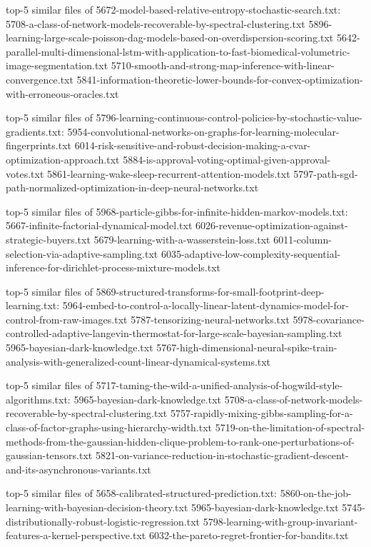 \documentclass[11pt]{article}
\begin{document}
top-5 similar files of
5672-model-based-relative-entropy-stochastic-search.txt:
5708-a-class-of-network-models-recoverable-by-spectral-clustering.txt
5896-learning-large-scale-poisson-dag-models-based-on-overdispersion-scoring.txt
5642-parallel-multi-dimensional-lstm-with-application-to-fast-biomedical-volumetric-image-segmentation.txt
5710-smooth-and-strong-map-inference-with-linear-convergence.txt
5841-information-theoretic-lower-bounds-for-convex-optimization-with-erroneous-oracles.txt

top-5 similar files of
5796-learning-continuous-control-policies-by-stochastic-value-gradients.txt:
5954-convolutional-networks-on-graphs-for-learning-molecular-fingerprints.txt
6014-risk-sensitive-and-robust-decision-making-a-cvar-optimization-approach.txt
5884-is-approval-voting-optimal-given-approval-votes.txt
5861-learning-wake-sleep-recurrent-attention-models.txt
5797-path-sgd-path-normalized-optimization-in-deep-neural-networks.txt

top-5 similar files of
5968-particle-gibbs-for-infinite-hidden-markov-models.txt:
5667-infinite-factorial-dynamical-model.txt
6026-revenue-optimization-against-strategic-buyers.txt
5679-learning-with-a-wasserstein-loss.txt
6011-column-selection-via-adaptive-sampling.txt
6035-adaptive-low-complexity-sequential-inference-for-dirichlet-process-mixture-models.txt

top-5 similar files of
5869-structured-transforms-for-small-footprint-deep-learning.txt:
5964-embed-to-control-a-locally-linear-latent-dynamics-model-for-control-from-raw-images.txt
5787-tensorizing-neural-networks.txt
5978-covariance-controlled-adaptive-langevin-thermostat-for-large-scale-bayesian-sampling.txt
5965-bayesian-dark-knowledge.txt
5767-high-dimensional-neural-spike-train-analysis-with-generalized-count-linear-dynamical-systems.txt

top-5 similar files of
5717-taming-the-wild-a-unified-analysis-of-hogwild-style-algorithms.txt:
5965-bayesian-dark-knowledge.txt
5708-a-class-of-network-models-recoverable-by-spectral-clustering.txt
5757-rapidly-mixing-gibbs-sampling-for-a-class-of-factor-graphs-using-hierarchy-width.txt
5719-on-the-limitation-of-spectral-methods-from-the-gaussian-hidden-clique-problem-to-rank-one-perturbations-of-gaussian-tensors.txt
5821-on-variance-reduction-in-stochastic-gradient-descent-and-its-asynchronous-variants.txt

top-5 similar files of 5658-calibrated-structured-prediction.txt:
5860-on-the-job-learning-with-bayesian-decision-theory.txt
5965-bayesian-dark-knowledge.txt
5745-distributionally-robust-logistic-regression.txt
5798-learning-with-group-invariant-features-a-kernel-perspective.txt
6032-the-pareto-regret-frontier-for-bandits.txt
\end{document}
